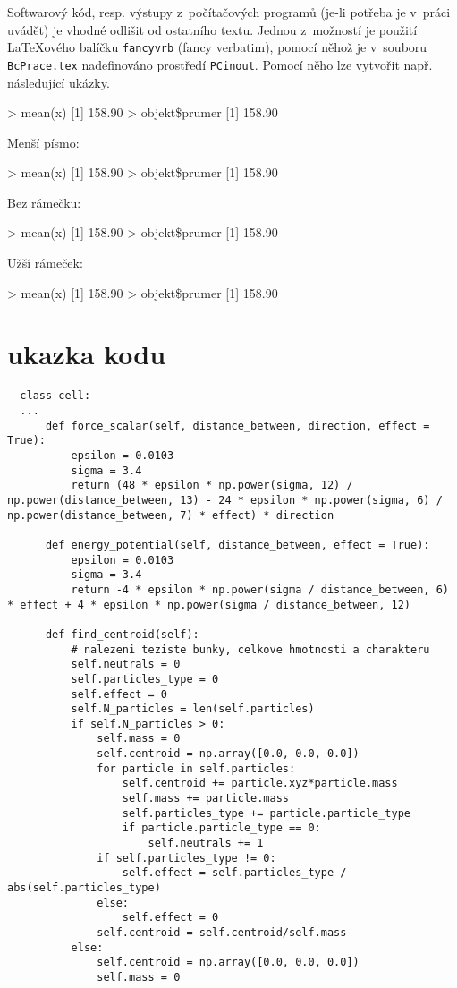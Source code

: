 Softwarový kód, resp. výstupy z~počítačových programů (je-li potřeba
je v~práci uvádět) je vhodné odlišit od ostatního textu. Jednou
z~možností je použití {\LaTeX}o\-vé\-ho balíčku \texttt{fancyvrb}
(fancy verbatim), pomocí něhož je v~souboru \texttt{BcPrace.tex}
nadefinováno prostředí \texttt{PCinout}. Pomocí něho lze vytvořit
např. následující ukázky.
\begin{PCinout}
> mean(x)
[1] 158.90
> objekt\$prumer
[1] 158.90
\end{PCinout}
Menší písmo:
\begin{PCinout}[fontsize=\footnotesize]
> mean(x)
[1] 158.90
> objekt\$prumer
[1] 158.90
\end{PCinout}
Bez rámečku:
\begin{PCinout}[frame=none]
> mean(x)
[1] 158.90
> objekt\$prumer
[1] 158.90
\end{PCinout}
Užší rámeček:
\begin{PCinout}[xrightmargin=20em]
> mean(x)
[1] 158.90
> objekt\$prumer
[1] 158.90
\end{PCinout}



\newpage
\section{ukazka kodu}
\begin{lstlisting}
  class cell:
  ...
      def force_scalar(self, distance_between, direction, effect = True):
          epsilon = 0.0103
          sigma = 3.4
          return (48 * epsilon * np.power(sigma, 12) / np.power(distance_between, 13) - 24 * epsilon * np.power(sigma, 6) / np.power(distance_between, 7) * effect) * direction

      def energy_potential(self, distance_between, effect = True):
          epsilon = 0.0103
          sigma = 3.4
          return -4 * epsilon * np.power(sigma / distance_between, 6) * effect + 4 * epsilon * np.power(sigma / distance_between, 12)

      def find_centroid(self):
          # nalezeni teziste bunky, celkove hmotnosti a charakteru
          self.neutrals = 0
          self.particles_type = 0
          self.effect = 0
          self.N_particles = len(self.particles)
          if self.N_particles > 0:
              self.mass = 0
              self.centroid = np.array([0.0, 0.0, 0.0])
              for particle in self.particles:
                  self.centroid += particle.xyz*particle.mass
                  self.mass += particle.mass
                  self.particles_type += particle.particle_type
                  if particle.particle_type == 0:
                      self.neutrals += 1
              if self.particles_type != 0:
                  self.effect = self.particles_type / abs(self.particles_type)
              else:
                  self.effect = 0
              self.centroid = self.centroid/self.mass
          else:
              self.centroid = np.array([0.0, 0.0, 0.0])
              self.mass = 0
\end{lstlisting}
